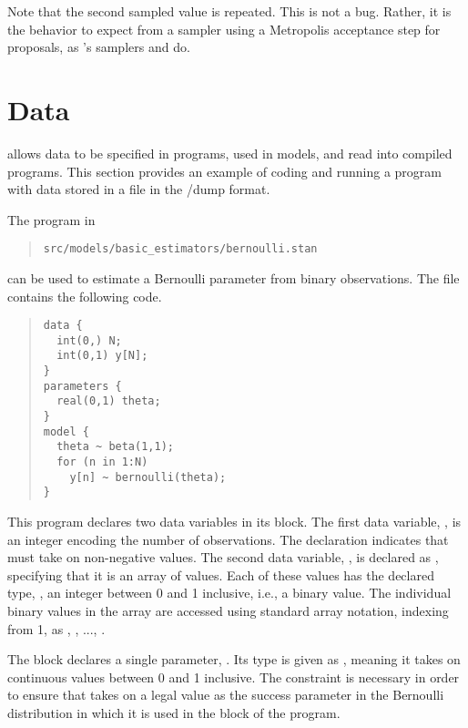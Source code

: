 Note that the second sampled value is repeated.  This is not a bug.
Rather, it is the behavior to expect from a sampler using a Metropolis
acceptance step for proposals, as \Stan's samplers \HMC and \NUTS do.

\section{Data}

\Stan allows data to be specified in programs, used in models, and
read into compiled \Stan programs. This section provides an example of
coding and running a \Stan program with data stored in a file in the
\SPLUS/\R dump format.

The \Stan program in 
\begin{quote}
\begin{Verbatim}
src/models/basic_estimators/bernoulli.stan
\end{Verbatim}
\end{quote}
can be used to estimate a Bernoulli parameter  from
 binary observations.  The file contains the following code.
%
\begin{quote}
\begin{Verbatim}
data {
  int(0,) N;
  int(0,1) y[N];
}
parameters {
  real(0,1) theta;
}
model {
  theta ~ beta(1,1);
  for (n in 1:N)
    y[n] ~ bernoulli(theta);
}
\end{Verbatim}
\end{quote}
%
This program declares two data variables in its  block.
The first data variable, , is an integer encoding the number
of observations.  The declaration  indicates that
 must take on non-negative values.  The second data variable,
, is declared as , specifying that it is an array
of  values.  Each of these values has the declared type,
, an integer between 0 and 1 inclusive, i.e., a binary
value.  The  individual binary values in the array 
are accessed using standard array notation, indexing from 1, as ,
, ..., .

The  block declares a single parameter, .
Its type is given as , meaning it takes on continuous
values between 0 and 1 inclusive.  The constraint is necessary in
order to ensure that  takes on a legal value as the
success parameter in the Bernoulli distribution in which it is used in
the  block of the program.

